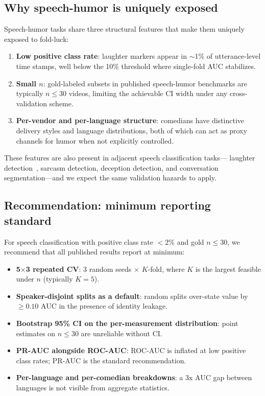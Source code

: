 \documentclass[11pt, letterpaper]{article}
\begin{document}
\subsection{Why speech-humor is uniquely exposed}

Speech-humor tasks share three structural features that make them
uniquely exposed to fold-luck:

\begin{enumerate}
\item \textbf{Low positive class rate}: laughter markers appear in
$\sim$1\% of utterance-level time stamps, well below the 10\% threshold
where single-fold AUC stabilizes.
\item \textbf{Small $n$}: gold-labeled subsets in published speech-humor
benchmarks are typically $n \leq 30$ videos, limiting the achievable CI
width under any cross-validation scheme.
\item \textbf{Per-vendor and per-language structure}: comedians have
distinctive delivery styles and language distributions, both of which can
act as proxy channels for humor when not explicitly controlled.
\end{enumerate}

These features are also present in adjacent speech classification tasks---
laughter detection~\cite{chucklenet}, sarcasm detection, deception detection,
and conversation segmentation---and we expect the same validation hazards
to apply.

\subsection{Recommendation: minimum reporting standard}

For speech classification with positive class rate $< 2\%$ and gold $n
\leq 30$, we recommend that all published results report at minimum:

\begin{itemize}
\item \textbf{5$\times$3 repeated CV}: 3 random seeds $\times$
$K$-fold, where $K$ is the largest feasible under $n$ (typically $K=5$).
\item \textbf{Speaker-disjoint splits as a default}: random splits
over-state value by $\geq 0.10$ AUC in the presence of identity leakage.
\item \textbf{Bootstrap 95\% CI on the per-measurement distribution}:
point estimates on $n \leq 30$ are unreliable without CI.
\item \textbf{PR-AUC alongside ROC-AUC}: ROC-AUC is inflated at low
positive class rates; PR-AUC is the standard recommendation.
\item \textbf{Per-language and per-comedian breakdowns}: a 3x AUC gap
between languages is not visible from aggregate statistics.
\end{itemize}
\end{document}
